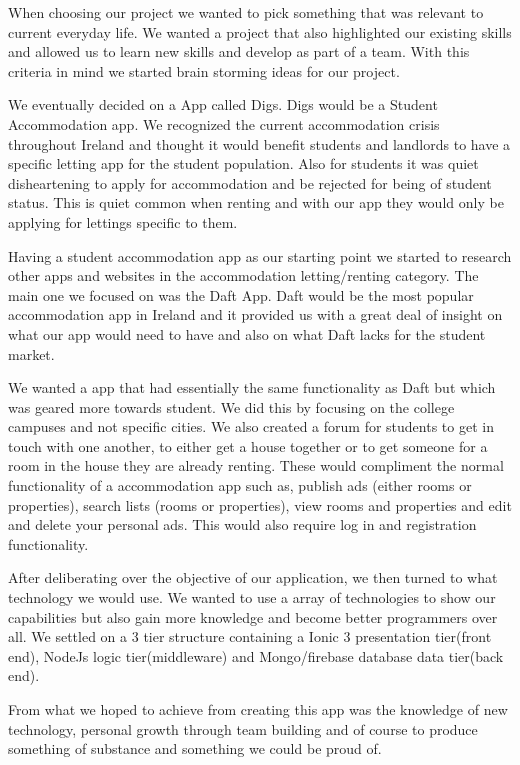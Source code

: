 When choosing our project we wanted to pick something that was relevant to current everyday life. We wanted a project that also highlighted our existing skills and allowed us to learn new skills and develop as part of a team. With this criteria in mind we started brain storming ideas for our project.

We eventually decided on a App called Digs. Digs would be a Student Accommodation app. We recognized the current accommodation crisis throughout Ireland and thought it would benefit students and landlords to have a specific letting app for the student population. Also for students it was quiet disheartening to apply for accommodation and be rejected for being of student status. This is quiet common when renting and with our app they would only be applying for lettings specific to them.

Having a student accommodation app as our starting point we started to research other apps and websites in the accommodation letting/renting category. The main one we focused on was the Daft App\cite{Daft}. Daft would be the most popular accommodation app in Ireland and it provided us with a great deal of insight on what our app would need to have and also on what Daft lacks for the student market. 

We wanted a app that had essentially the same functionality as Daft but which was geared more towards student. We did this by focusing on the college campuses and not specific cities. We also created a forum for students to get in touch with one another, to either get a house together or to get someone for a room in the house they are already renting. These would compliment the normal functionality of a accommodation app such as, publish ads (either rooms or properties), search lists (rooms or properties), view rooms and properties and edit and delete your personal ads. This would also require log in and registration functionality.

After deliberating over the objective of our application, we then turned to what technology we would use. We wanted to use a array of technologies to show our capabilities but also gain more knowledge and become better programmers over all. We settled on a 3 tier structure containing a Ionic 3 presentation tier(front end), NodeJs logic tier(middleware)  and Mongo/firebase database data tier(back end).

From what we hoped to achieve from creating this app was the knowledge of new technology, personal growth through team building and of course to produce something of substance and something we could be proud of.

